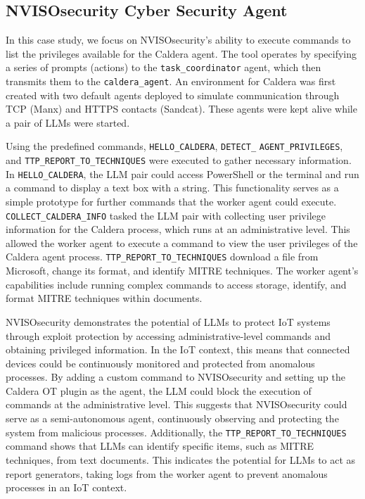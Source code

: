 \subsection{NVISOsecurity Cyber Security Agent}
%
\begin{comment}
\begin{figure}[h!]
    \centering
    \texttt{[image: images/NVISOSecurity.png]}
    \caption{Illustration of NVISOSecurity Implementation}
    \label{fig:nviso}
\end{figure}
\end{comment}
%
In this case study, we focus on NVISOsecurity's ability to execute commands to list the privileges available for the Caldera agent.
The tool operates by specifying a series of prompts (actions) to the \texttt{task\_coordinator} agent, which then transmits them to the \texttt{caldera\_agent}.
An environment for Caldera was first created with two default agents deployed to simulate communication through TCP (Manx) and HTTPS contacts (Sandcat).
These agents were kept alive while a pair of LLMs were started.

Using the predefined commands, \texttt{HELLO\_CALDERA}, \texttt{DETECT\_} \texttt{AGENT\_PRIVILEGES}, and \texttt{TTP\_REPORT\_TO\_TECHNIQUES} were executed to gather necessary information.
In \texttt{HELLO\_CALDERA}, the LLM pair could access PowerShell or the terminal and run a command to display a text box with a string.
This functionality serves as a simple prototype for further commands that the worker agent could execute.
\texttt{COLLECT\_CALDERA\_INFO} tasked the LLM pair with collecting user privilege information for the Caldera process, which runs at an administrative level.
This allowed the worker agent to execute a command to view the user privileges of the Caldera agent process.
\texttt{TTP\_REPORT\_TO\_TECHNIQUES} download a file from Microsoft, change its format, and identify MITRE techniques.
The worker agent's capabilities include running complex commands to access storage, identify, and format MITRE techniques within documents.

NVISOsecurity demonstrates the potential of LLMs to protect IoT systems through exploit protection by accessing administrative-level commands and obtaining privileged information.
In the IoT context, this means that connected devices could be continuously monitored and protected from anomalous processes.
By adding a custom command to NVISOsecurity and setting up the Caldera OT plugin as the agent, the LLM could block the execution of commands at the administrative level.
This suggests that NVISOsecurity could serve as a semi-autonomous agent, continuously observing and protecting the system from malicious processes.
Additionally, the \texttt{TTP\_REPORT\_TO\_TECHNIQUES} command shows that LLMs can identify specific items, such as MITRE techniques, from text documents.
This indicates the potential for LLMs to act as report generators, taking logs from the worker agent to prevent anomalous processes in an IoT context.

